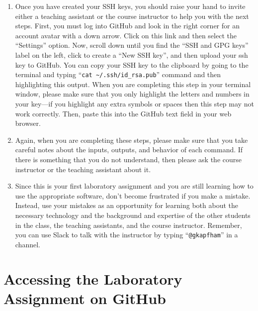 \documentclass[11pt]{article}
\newcommand{\command}[1]{``\lstinline{#1}''}
\begin{document}
\begin{enumerate}
  \item Once you have created your SSH keys, you should raise your hand to
    invite either a teaching assistant or the course instructor to help you with
    the next steps. First, you must log into GitHub and look in the right corner
    for an account avatar with a down arrow. Click on this link and then select
    the ``Settings'' option. Now, scroll down until you find the ``SSH and GPG
    keys'' label on the left, click to create a ``New SSH key'', and then upload
    your ssh key to GitHub. You can copy your SSH key to the clipboard by going
    to the terminal and typing ``{\tt cat \textasciitilde{}/.ssh/id\_rsa.pub}''
    command and then highlighting this output. When you are completing this step
    in your terminal window, please make sure that you only highlight the
    letters and numbers in your key---if you highlight any extra symbols or
    spaces then this step may not work correctly. Then, paste this into the
    GitHub text field in your web browser.

  \item Again, when you are completing these steps, please make sure that you
    take careful notes about the inputs, outputs, and behavior of each command.
    If there is something that you do not understand, then please ask the course
    instructor or the teaching assistant about it.

  \item Since this is your first laboratory assignment and you are still
    learning how to use the appropriate software, don't become frustrated if you
    make a mistake. Instead, use your mistakes as an opportunity for learning
    both about the necessary technology and the background and expertise of the
    other students in the class, the teaching assistants, and the course
    instructor. Remember, you can use Slack to talk with the instructor by
    typing \command{@gkapfham} in a channel.

\end{enumerate}

\section*{Accessing the Laboratory Assignment on GitHub}
\end{document}
